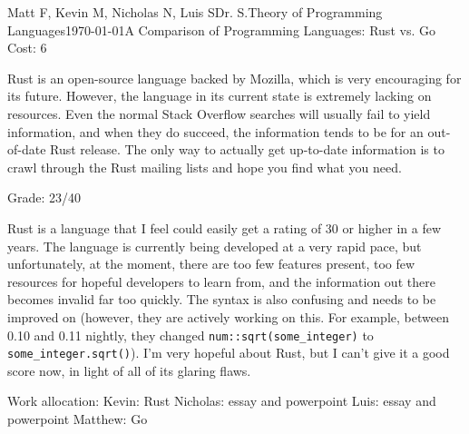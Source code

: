 \documentclass[12pt,letterpaper]{article}
\begin{document}
\begin{mla}{Matt F, Kevin M, Nicholas N, Luis S}{}{Dr. S.}{Theory of Programming Languages}{\today}{A Comparison of Programming Languages: Rust vs. Go}
Cost: 6

Rust is an open-source language backed by Mozilla, which is very encouraging for its future. However, the language in its current state is extremely lacking on resources. Even the normal Stack Overflow searches will usually fail to yield information, and when they do succeed, the information tends to be for an out-of-date Rust release. The only way to actually get up-to-date information is to crawl through the Rust mailing lists and hope you find what you need.

Grade: 23/40

Rust is a language that I feel could easily get a rating of 30 or higher in a few years. The language is currently being developed at a very rapid pace, but unfortunately, at the moment, there are too few features present, too few resources for hopeful developers to learn from, and the information out there becomes invalid far too quickly. The syntax is also confusing and needs to be improved on (however, they are actively working on this. For example, between 0.10 and 0.11 nightly, they changed \texttt{num::sqrt(some\_integer)} to \texttt{some\_integer.sqrt()}). I'm very hopeful about Rust, but I can't give it a good score now, in light of all of its glaring flaws.

Work allocation:
Kevin: Rust
Nicholas: essay and powerpoint
Luis: essay and powerpoint
Matthew: Go


\end{mla}
\end{document}

